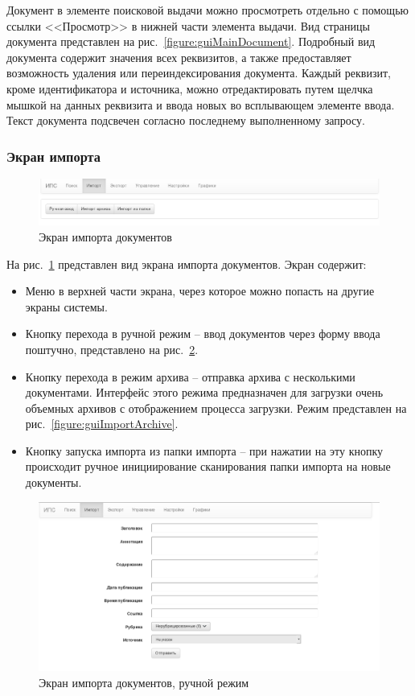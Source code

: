   Документ в элементе поисковой выдачи можно просмотреть отдельно с помощью ссылки <<Просмотр>> в нижней части элемента выдачи. Вид страницы документа представлен на рис.~\ref{figure:guiMainDocument}. Подробный вид документа содержит значения всех реквизитов, а также предоставляет возможность удаления или переиндексирования документа. Каждый реквизит, кроме идентификатора и источника, можно отредактировать путем щелчка мышкой на данных реквизита и ввода новых во всплывающем элементе ввода. Текст документа подсвечен согласно последнему выполненному запросу.

\clearpage
\subsubsection{Экран импорта}

  \begin{figure}[h!]
  \centering
  \includegraphics[width=0.9\linewidth]{technology/gui_import}
  \caption{Экран импорта документов}
  \label{figure:guiImport}
  \end{figure}

  На рис.~\ref{figure:guiImport} представлен вид экрана импорта документов. Экран содержит:
  \begin{itemize}
  \item Меню в верхней части экрана, через которое можно попасть на другие экраны системы.
  \item Кнопку перехода в ручной режим -- ввод документов через форму ввода поштучно, представлено на рис.~\ref{figure:guiImportSingle}.
  \item Кнопку перехода в режим архива -- отправка архива с несколькими документами. Интерфейс этого режима предназначен для загрузки очень объемных архивов с отображением процесса загрузки. Режим представлен на рис.~\ref{figure:guiImportArchive}.
  \item Кнопку запуска импорта из папки импорта -- при нажатии на эту кнопку происходит ручное инициирование сканирования папки импорта на новые документы.
  \end{itemize}

  \begin{figure}[h!]
  \centering
  \includegraphics[width=0.9\linewidth]{technology/gui_import_single}
  \caption{Экран импорта документов, ручной режим}
  \label{figure:guiImportSingle}
  \end{figure}


